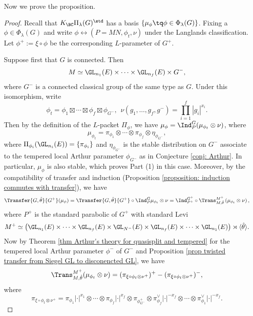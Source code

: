\documentclass[11pt,letterpaper]{amsart}
\numberwithin{equation}{section}
\begin{document}
Now we prove the proposition.
\begin{proof}

Recall that $K_{\BC}\Pi_{\lambda}(G)^{\std}$ has a basis $\{\mu_{\phi}\tq\phi \in \Phi_{\lambda}(G)\}$. Fixing a $\phi \in \Phi_{\lambda}(G)$ and write $\phi \leftrightarrow (P=MN, \phi_t, \nu)$ under the Langlands classification. Let $\phi^+:= \xi \circ \phi$ be the corresponding $L$-parameter of $G^+$.

Suppose first that $G$ is connected. Then 
\[ M \simeq \GL_{n_1}(E) \times \cdots \times \GL_{n_f}(E) \times G^-,\]
where $G^-$ is a connected classical group of the same type as $G$. Under this isomorphism, write 
\[ \phi_t= \phi_1 \boxtimes \cdots \boxtimes \phi_f \boxtimes \phi_{G^-},\ \ \nu( g_1,\ldots,g_f, g^-)= \prod_{i=1}^f |g_i|^{x_i}.\]
 Then by the definition of the $L$-packet $\Pi_{\phi}$, we have  $\mu_{\phi}= \Ind_P^G (\mu_{\phi_t}\otimes \nu)$, where
\[ \mu_{\phi_t}= \pi_{\phi_1} \otimes \cdots \otimes \pi_{\phi_f} \otimes  \eta_{\phi_{G^-}},\]
where $\Pi_{\phi_i}(\GL_{n_i}(E))= \{\pi_{\phi_i}\}$ and $\eta_{\phi_{G^-}}$ is the stable distribution on $G^-$ associate to the tempered local Arthur parameter $\phi_{G^-}$ as in Conjecture \ref{conj: Arthur}. In particular, $\mu_{\phi}$ is also stable, which proves Part (1) in this case. Moreover, by the compatibility of transfer and induction (Proposition \ref{proposition: induction commutes with transfer}), we have 
\[ \Transfer{G,\hat{\theta}}{ G^+} (\mu_{\phi})=\Transfer{G,\hat{\theta}}{ G^+}  \circ \Ind_{P}^G \mu_{\phi_t}\otimes \nu= \Ind_{P^+}^{G^+}  \circ \Trans_{M,\hat{\theta}}^{M^+} \left( \mu_{\phi_t} \otimes \nu \right), \]
where $P^+$ is the standard parabolic of $G^+$ with standard Levi 
\[ M^+ \simeq \big{(}\GL_{n_1}(E) \times \cdots \times \GL_{n_f}(E) \times \GL_{N^-}(E) \times \GL_{n_f}(E) \times \cdots \times \GL_{n_1}(E)  \big{)} \rtimes \langle \hat{\theta} \rangle.\]
Now by Theorem \ref{thm Arthur's theory for quasisplit and tempered} for the tempered local Arthur parameter $\phi^-$ of $G^-$ and Proposition \ref{prop twisted transfer from Siegel GL to disconencted GL}, we have 
\begin{equation}\label{eqn: Siegelish}
\Trans_{M,\hat{\theta}}^{M^+} (\mu_{\phi_t} \otimes \nu )= (\pi_{\xi\circ \phi_t\otimes \nu^+})^+ -(\pi_{\xi\circ \phi_t\otimes \nu^+})^-,
\end{equation}
where 
 \[\pi_{\xi\circ \phi_t \otimes \nu^+} =\pi_{\phi_1}\lvert\cdot \rvert^{x_1} \otimes \cdots \otimes \pi_{\phi_f}\lvert\cdot \rvert^{x_f} \otimes \pi_{\phi_{G^-}^+}  \otimes \pi_{\phi_f}^{\vee}\lvert\cdot \rvert^{-x_f} \otimes \cdots \otimes \pi_{\phi_1}^{\vee}\lvert\cdot \rvert^{-x_f}.\]

\end{proof}
\end{document}
